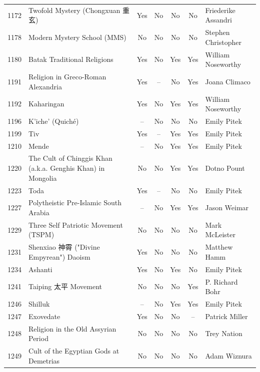 {\begin{longtable}{rp{3.5cm}ccccp{3cm}}
1172 & {\raggedright Twofold Mystery (Chongxuan 重玄)} & Yes & No & No & No & {\raggedright Friederike Assandri} \\
1178 & {\raggedright Modern Mystery School (MMS)} & No & No & No & No & {\raggedright Stephen Christopher} \\
1180 & {\raggedright Batak Traditional Religions} & Yes & No & Yes & Yes & {\raggedright William Noseworthy} \\
1191 & {\raggedright Religion in Greco-Roman Alexandria} & Yes & -- & No & Yes & {\raggedright Joana Climaco} \\
1192 & {\raggedright Kaharingan} & Yes & No & Yes & Yes & {\raggedright William Noseworthy} \\
1196 & {\raggedright K’iche’ (Quiché)} & -- & No & No & No & {\raggedright Emily Pitek} \\
1199 & {\raggedright Tiv} & Yes & -- & Yes & Yes & {\raggedright Emily Pitek} \\
1210 & {\raggedright Mende} & -- & No & Yes & Yes & {\raggedright Emily Pitek} \\
1220 & {\raggedright The Cult of Chinggis Khan (a.k.a. Genghis Khan) in Mongolia} & No & No & Yes & Yes & {\raggedright Dotno Pount} \\
1223 & {\raggedright Toda} & Yes & -- & No & No & {\raggedright Emily Pitek} \\
1227 & {\raggedright Polytheistic Pre-Islamic South Arabia} & -- & No & Yes & Yes & {\raggedright Jason Weimar} \\
1229 & {\raggedright Three Self Patriotic Movement (TSPM)} & No & No & No & No & {\raggedright Mark McLeister} \\
1231 & {\raggedright Shenxiao 神霄 ("Divine Empyrean") Daoism} & Yes & No & No & No & {\raggedright Matthew Hamm} \\
1234 & {\raggedright Ashanti} & Yes & No & Yes & No & {\raggedright Emily Pitek} \\
1241 & {\raggedright Taiping 太平 Movement} & No & No & No & Yes & {\raggedright P. Richard Bohr} \\
1246 & {\raggedright Shilluk} & -- & No & Yes & Yes & {\raggedright Emily Pitek} \\
1247 & {\raggedright Exovedate} & Yes & No & No & -- & {\raggedright Patrick Miller} \\
1248 & {\raggedright Religion in the Old Assyrian Period} & No & No & No & No & {\raggedright Trey Nation} \\
1249 & {\raggedright Cult of the Egyptian Gods at Demetrias} & No & No & No & No & {\raggedright Adam Wiznura} \\

\end{longtable}}

